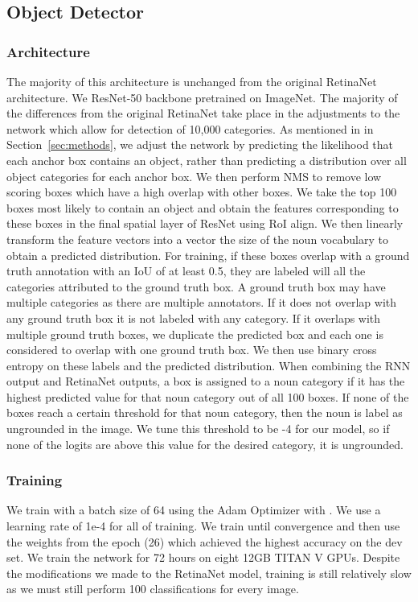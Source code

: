 \documentclass[runningheads]{llncs}
\begin{document}
\subsection{Object Detector}
\subsubsection{Architecture}
The majority of this architecture is unchanged from the original RetinaNet architecture. We ResNet-50 backbone pretrained on ImageNet. The majority of the differences from the original RetinaNet take place in the adjustments to the network which allow for detection of 10,000 categories. As mentioned in in Section~\ref{sec:methods}, we adjust the network by predicting the likelihood that each anchor box contains an object, rather than predicting a distribution over all object categories for each anchor box. We then perform NMS to remove low scoring boxes which have a high overlap with other boxes. We take the top 100 boxes most likely to contain an object and obtain the features corresponding to these boxes in the final spatial layer of ResNet using RoI align. We then linearly transform the feature vectors into a vector the size of the noun vocabulary to obtain a predicted distribution. For training, if these boxes overlap with a ground truth annotation with an IoU of at least 0.5, they are labeled will all the categories attributed to the ground truth box. A ground truth box may have multiple categories as there are multiple annotators. If it does not overlap with any ground truth box it is not labeled with any category. If it overlaps with multiple ground truth boxes, we duplicate the predicted box and each one is considered to overlap with one ground truth box. We then use binary cross entropy on these labels and the predicted distribution. When combining the RNN output and RetinaNet outputs, a box is assigned to a noun category if it has the highest predicted value for that noun category out of all 100 boxes. If none of the boxes reach a certain threshold for that noun category, then the noun is label as ungrounded in the image. We tune this threshold to be -4 for our model, so if none of the logits are above this value for the desired category, it is ungrounded. 

\subsubsection{Training}
We train with a batch size of 64 using the Adam Optimizer \cite{KingmaAndBa2015} with . We use a learning rate of 1e-4 for all of training. We train until convergence and then use the weights from the epoch (26) which achieved the highest accuracy on the dev set. We train the network for 72 hours on eight 12GB TITAN V GPUs. Despite the modifications we made to the RetinaNet model, training is still relatively slow as we must still perform 100 classifications for every image. 
\end{document}
